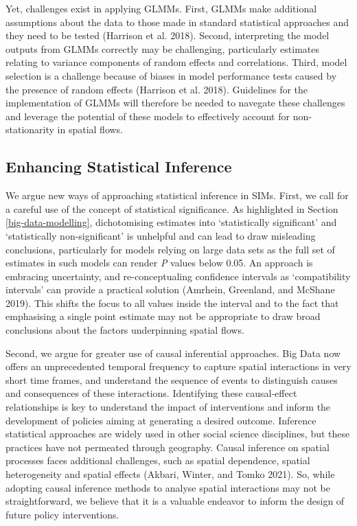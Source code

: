 \documentclass[11pt,letterpaper]{article}
\begin{document}
Yet, challenges exist in applying GLMMs.
First, GLMMs make additional assumptions about the data to those made in standard statistical approaches and they need to be tested (Harrison et al. 2018).
Second, interpreting the model outputs from GLMMs correctly may be challenging, particularly estimates relating to variance components of random effects and correlations.
Third, model selection is a challenge because of biases in model performance tests caused by the presence of random effects (Harrison et al. 2018).
Guidelines for the implementation of GLMMs will therefore be needed to navegate these challenges and leverage the potential of these models to effectively account for non-stationarity in spatial flows.

\hypertarget{enhancing-statistical-inference}{%
\subsection{Enhancing Statistical Inference}\label{enhancing-statistical-inference}}

We argue new ways of approaching statistical inference in SIMs.
First, we call for a careful use of the concept of statistical significance.
As highlighted in Section \ref{big-data-modelling}, dichotomising estimates into `statistically significant' and `statistically non-significant' is unhelpful and can lead to draw misleading conclusions, particularly for models relying on large data sets as the full set of estimates in such models can render \emph{P} values below 0.05.
An approach is embracing uncertainty, and re-conceptualing confidence intervals as `compatibility intervals' can provide a practical solution (Amrhein, Greenland, and McShane 2019).
This shifts the focus to all values inside the interval and to the fact that emphasising a single point estimate may not be appropriate to draw broad conclusions about the factors underpinning spatial flows.

Second, we argue for greater use of causal inferential approaches.
Big Data now offers an unprecedented temporal frequency to capture spatial interactions in very short time frames, and understand the sequence of events to distinguish causes and consequences of these interactions.
Identifying these causal-effect relationships is key to understand the impact of interventions and inform the development of policies aiming at generating a desired outcome.
Inference statistical approaches are widely used in other social science disciplines, but these practices have not permeated through geography.
Causal inference on spatial processes faces additional challenges, such as spatial dependence, spatial heterogeneity and spatial effects (Akbari, Winter, and Tomko 2021).
So, while adopting causal inference methods to analyse spatial interactions may not be straightforward, we believe that it is a valuable endeavor to inform the design of future policy interventions.
\end{document}
